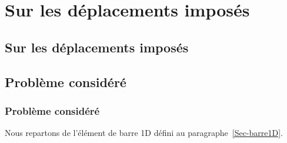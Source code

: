\ifVersionAvecExemplesSepares
   \chapter{Sur les déplacements imposés}\label{Ch-DispLag}%
\else
   \section{Sur les déplacements imposés}\label{Ch-DispLag}%
\fi

\medskip
\ifVersionAvecExemplesSepares
   \section{Problème considéré}
\else
   \subsection{Problème considéré}
\fi

Nous repartons de l'élément de barre 1D défini au paragraphe~\ref{Sec-barre1D}.

